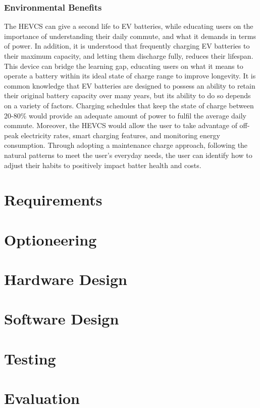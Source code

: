 \documentclass [12pt]{article}
\begin{document}
\subsubsection{Environmental Benefits}
The HEVCS can give a second life to EV batteries, while educating users on the importance of understanding their daily commute, and what it demands in terms of power. In addition, it is understood that frequently charging EV batteries to their maximum capacity, and letting them discharge fully, reduces their lifespan. This device can bridge the learning gap, educating users on what it means to operate a battery within its ideal state of charge range to improve longevity. 
It is common knowledge that EV batteries are designed to possess an ability to retain their original battery capacity over many years, but its ability to do so depends on a variety of factors. Charging schedules that keep the state of charge between 20-80\% would provide an adequate amount of power to fulfil the average daily commute. Moreover, the HEVCS would allow the user to take advantage of off-peak electricity rates, smart charging features, and monitoring energy consumption. Through adopting a maintenance charge approach, following the natural patterns to meet the user’s everyday needs, the user can identify how to adjust their habits to positively impact batter health and costs.


\newpage
\section{Requirements}

\newpage
\section{Optioneering}

\newpage
\section{Hardware Design}

\newpage
\section{Software Design}

\newpage
\section{Testing}

\newpage
\section{Evaluation}
\end{document}
